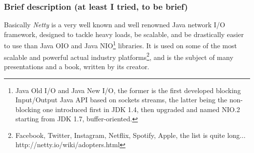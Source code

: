 \documentclass[a4paper]{report}
\begin{document}
\subsubsection{Brief description (at least I tried, to be brief)}
Basically \emph{Netty} is a very well known and well renowned Java network I/O framework, designed to  tackle heavy loads, be scalable, and be drastically easier to use than Java OIO and Java NIO\footnote{Java Old I/O and Java New I/O, the former is the first developed blocking Input/Output Java API based on sockets streams, the latter being the non-blocking one introduced first in JDK 1.4, then upgraded and named NIO.2 starting from JDK 1.7, buffer-oriented.} libraries. It is used on some of the most scalable and powerful actual industry platforms\footnote{Facebook, Twitter, Instagram, Netflix, Spotify, Apple, the list is quite long... http://netty.io/wiki/adopters.html}, and is the subject of many presentations and a book, written by its creator.\\
\end{document}
